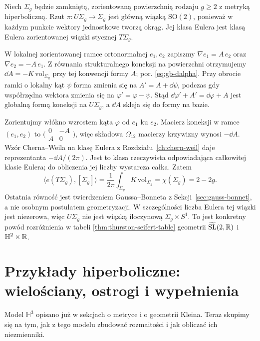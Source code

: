 \begin{przyklad}
\label{prz:thur-dop-seifert-euler}
Niech $\Sigma_g$ będzie zamkniętą, zorientowaną powierzchnią
rodzaju $g\ge2$ z metryką hiperboliczną. Rzut
$\pi:U\Sigma_g\to\Sigma_g$ jest główną wiązką
$\mathrm{SO}(2)$, ponieważ w każdym punkcie wektory
jednostkowe tworzą okrąg. Jej klasa Eulera jest klasą
Eulera zorientowanej wiązki stycznej $T\Sigma_g$.

W lokalnej zorientowanej ramce ortonormalnej $e_1,e_2$
zapiszmy $\nabla e_1=A\,e_2$ oraz
$\nabla e_2=-A\,e_1$. Z równania strukturalnego
koneksji na powierzchni otrzymujemy
$\dd A=-K\,\mathrm{vol}_{\Sigma_g}$
przy tej konwencji formy $A$; por.
\eqref{eq:gb-dalpha}. Przy obrocie ramki o lokalny kąt $\psi$
forma zmienia się na $A'=A+\dd\psi$, podczas gdy współrzędna
wektora zmienia się na $\varphi'=\varphi-\psi$.
Stąd $\dd\varphi'+A'=\dd\varphi+A$ jest globalną formą
koneksji na $U\Sigma_g$, a $\dd A$ skleja się do formy na bazie.

Zorientujmy włókno wzrostem kąta $\varphi$ od $e_1$ ku $e_2$.
Macierz koneksji w ramce $(e_1,e_2)$ to
$\bigl(\begin{smallmatrix}0&-A\\A&0\end{smallmatrix}\bigr)$,
więc składowa $\Omega_{12}$ macierzy krzywizny wynosi $-\dd A$.
Wzór Cherna--Weila na klasę Eulera z
Rozdziału~\ref{ch:chern-weil} daje reprezentanta
$-\dd A/(2\pi)$. Jest to klasa rzeczywista odpowiadająca
całkowitej klasie Eulera; do obliczenia jej liczby wystarcza całka.
Zatem
\[
 \langle e(T\Sigma_g),[\Sigma_g]\rangle
 =\frac1{2\pi}\int_{\Sigma_g}K\,\mathrm{vol}_{\Sigma_g}
 =\chi(\Sigma_g)=2-2g.
\]
Ostatnia równość jest twierdzeniem Gaussa--Bonneta
z Sekcji~\ref{sec:gauss-bonnet}, a nie osobnym postulatem
geometryzacji. W szczególności liczba Eulera
tej wiązki jest niezerowa, więc $U\Sigma_g$ nie jest
wiązką iloczynową $\Sigma_g\times S^1$.
To jest konkretny powód rozróżnienia w tabeli
\ref{thm:thurston-seifert-table} geometrii
$\widetilde{\mathrm{SL}}(2,\mathbb{R})$ i $\mathbb H^2\times\mathbb{R}$.
\end{przyklad}

\section{Przykłady hiperboliczne: wielościany, ostrogi i wypełnienia}
\label{sec:thur-dop-hiperboliczne}
Model $\mathbb H^3$ opisano już w sekcjach o metryce i o
geometrii Kleina. Teraz skupimy się na tym, jak z tego modelu
zbudować rozmaitości i jak obliczać ich niezmienniki.

